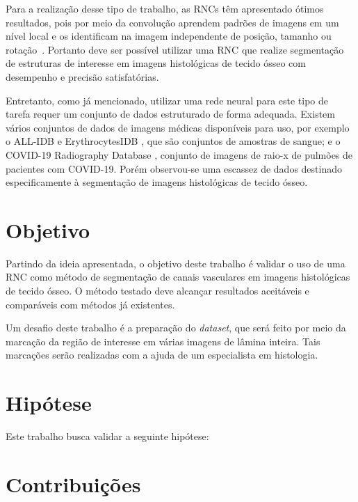     Para a realização desse tipo de trabalho, as \acs{RNC}s têm apresentado ótimos resultados, pois por meio da convolução aprendem padrões de imagens em um nível local e os identificam na imagem independente de posição, tamanho ou rotação~\cite{mueller2019deep}. Portanto deve ser possível utilizar uma \acs{RNC} que realize segmentação de estruturas de interesse em imagens histológicas de tecido ósseo com desempenho e precisão satisfatórias.
    
    Entretanto, como já mencionado, utilizar uma rede neural para este tipo de tarefa requer um conjunto de dados estruturado de forma adequada.
    Existem vários conjuntos de dados de imagens médicas disponíveis para uso, por exemplo o ALL-IDB \cite{Labati2011} e ErythrocytesIDB \cite{Gonzalez-Hidalgo2015}, que são conjuntos de amostras de sangue; e o COVID-19 Radiography Database \cite{Chowdhury2020}, conjunto de imagens de raio-x de pulmões de pacientes com COVID-19. Porém observou-se uma escassez de dados destinado especificamente à segmentação de imagens histológicas de tecido ósseo.
    
\section{Objetivo}

    Partindo da ideia apresentada, o objetivo deste trabalho é validar o uso de uma \ac{RNC} como método de segmentação de canais vasculares em imagens histológicas de tecido ósseo. O método testado deve alcançar resultados aceitáveis e comparáveis com métodos já existentes.
    
    Um desafio deste trabalho é a preparação do \textit{dataset}, que será feito por meio da marcação da região de interesse em várias imagens de lâmina inteira. Tais marcações serão realizadas com a ajuda de um especialista em histologia.

\section{Hipótese}
Este trabalho busca validar a seguinte hipótese: \bigskip

\setlength{\fboxsep}{12pt}
\bigskip

\section{Contribuições}

